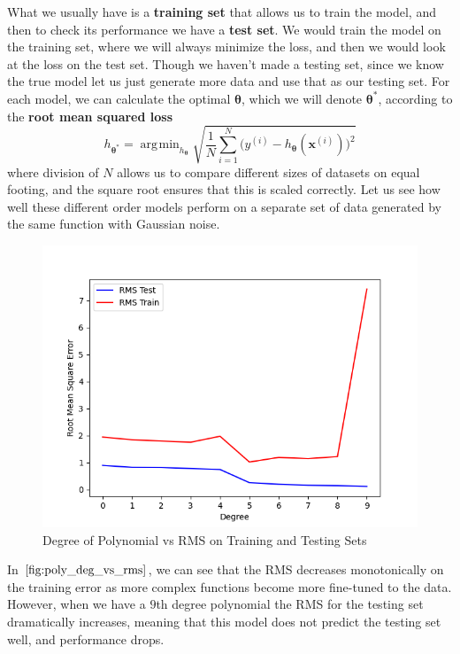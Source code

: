 \documentclass{article}
\DeclareMathOperator*{\argmin}{\arg\!\min}
\theoremstyle{definition}
\begin{document}
    What we usually have is a \textbf{training set} that allows us to train the model, and then to check its performance we have a \textbf{test set}. We would train the model on the training set, where we will always minimize the loss, and then we would look at the loss on the test set. Though we haven't made a testing set, since we know the true model let us just generate more data and use that as our testing set. For each model, we can calculate the optimal $\boldsymbol{\theta}$, which we will denote $\boldsymbol{\theta}^\ast$, according to the \textbf{root mean squared loss}
    \[h_{\boldsymbol{\theta}^\ast} = \argmin_{h_{\boldsymbol{\theta}}} \sqrt{ \frac{1}{N} \sum_{i=1}^N \big( y^{(i)} - h_{\boldsymbol{\theta}} (\mathbf{x}^{(i)}) \big)^2 }\]
    where division of $N$ allows us to compare different sizes of datasets on equal footing, and the square root ensures that this is scaled correctly. Let us see how well these different order models perform on a separate set of data generated by the same function with Gaussian noise. 
    \begin{figure}[hbt!]
        \centering
        \includegraphics[scale=0.4]{polynomial_first/Degree_vs_RMS.png}
        \caption{Degree of Polynomial vs RMS on Training and Testing Sets}
        \label{fig:poly_deg_vs_rms}
    \end{figure}
    In $\ref{fig:poly_deg_vs_rms}$, we can see that the RMS decreases monotonically on the training error as more complex functions become more fine-tuned to the data. However, when we have a $9$th degree polynomial the RMS for the testing set dramatically increases, meaning that this model does not predict the testing set well, and performance drops. 
\end{document}
